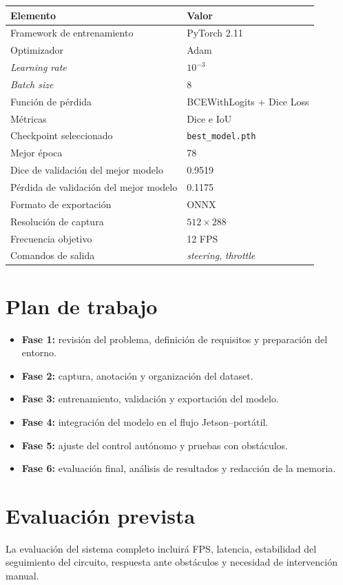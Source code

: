 \documentclass{article}
\begin{document}
\begin{table}[h]
\centering
\begin{tabular}{ll}
\toprule
\textbf{Elemento} & \textbf{Valor} \\
\midrule
Framework de entrenamiento & PyTorch 2.11 \\
Optimizador & Adam \\
\textit{Learning rate} & $10^{-3}$ \\
\textit{Batch size} & 8 \\
Funci\'on de p\'erdida & BCEWithLogits + Dice Loss \\
M\'etricas & Dice e IoU \\
Checkpoint seleccionado & \texttt{best\_model.pth} \\
Mejor \'epoca & 78 \\
Dice de validaci\'on del mejor modelo & 0.9519 \\
P\'erdida de validaci\'on del mejor modelo & 0.1175 \\
Formato de exportaci\'on & ONNX \\
Resoluci\'on de captura & $512 \times 288$ \\
Frecuencia objetivo & 12 FPS \\
Comandos de salida & \textit{steering}, \textit{throttle} \\
\bottomrule
\end{tabular}
\end{table}

\section{Plan de trabajo}

\begin{itemize}
    \item \textbf{Fase 1:} revisi\'on del problema, definici\'on de requisitos y preparaci\'on del entorno.
    \item \textbf{Fase 2:} captura, anotaci\'on y organizaci\'on del dataset.
    \item \textbf{Fase 3:} entrenamiento, validaci\'on y exportaci\'on del modelo.
    \item \textbf{Fase 4:} integraci\'on del modelo en el flujo Jetson--port\'atil.
    \item \textbf{Fase 5:} ajuste del control aut\'onomo y pruebas con obst\'aculos.
    \item \textbf{Fase 6:} evaluaci\'on final, an\'alisis de resultados y redacci\'on de la memoria.
\end{itemize}

\section{Evaluaci\'on prevista}

La evaluaci\'on del sistema completo incluir\'a FPS, latencia, estabilidad del seguimiento del circuito, respuesta ante obst\'aculos y necesidad de intervenci\'on manual.
\end{document}
